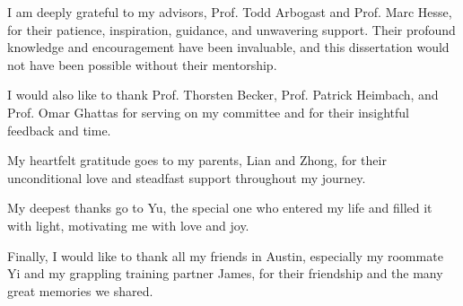 \begin{acknowledgments}		%

I am deeply grateful to my advisors, Prof. Todd Arbogast and Prof. Marc Hesse, for their patience, inspiration, guidance, and unwavering support. 
Their profound knowledge and encouragement have been invaluable, and this dissertation would not have been possible without their mentorship.

I would also like to thank Prof. Thorsten Becker, Prof. Patrick Heimbach, and Prof. Omar Ghattas for serving on my committee and for their insightful feedback and time.

My heartfelt gratitude goes to my parents, Lian and Zhong, for their unconditional love and steadfast support throughout my journey.

My deepest thanks go to Yu, the special one who entered my life and filled it with light, motivating me with love and joy.

Finally, I would like to thank all my friends in Austin, especially my roommate Yi and my grappling training partner James, for their friendship and the many great memories we shared.

\end{acknowledgments}


